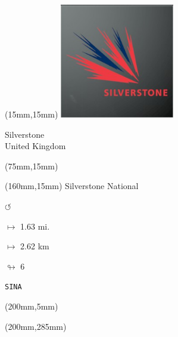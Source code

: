 \begin{textblock*}{50mm}(15mm,15mm)%
\includegraphics[width=50mm]{LG/2015-05-20_00094.png}
\par Silverstone\\ United Kingdom
\end{textblock*}
\begin{textblock*}{80mm}(75mm,15mm)%
\end{textblock*}
\begin{textblock*}{40mm}(160mm,15mm)%
Silverstone National
\par \Huge$\circlearrowleft$
\Large
\par$\mapsto$ 1.63 mi.
\par$\mapsto$ 2.62 km
\par$\looparrowright$ 6
\par\hfill\tiny\tt SINA\\
\end{textblock*}
\begin{textblock*}{20mm}(200mm,5mm)%
\fbox{\thepage}
\end{textblock*}
\begin{textblock*}{20mm}(200mm,285mm)%
\fbox{\thepage}
\end{textblock*}

